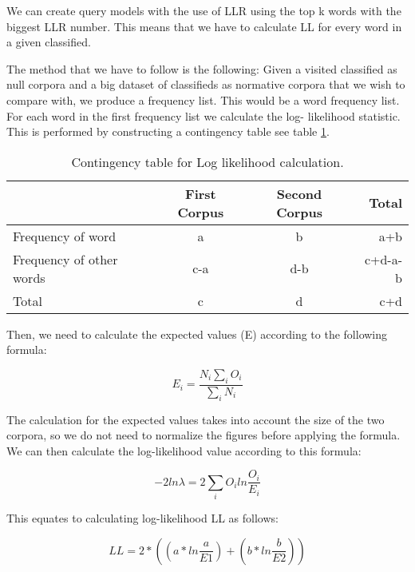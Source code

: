 We can create query models with the use of LLR using the top k words with the biggest LLR number. This means that we have to calculate LL for every word in a given classified.

The method that we have to follow is the following:
Given a visited classified as null corpora and a big dataset of classifieds as normative corpora that we wish to compare with, we produce a frequency list. This would be a word frequency list. For each word in the first frequency list we calculate the log- likelihood statistic. This is performed by constructing a contingency table see table \ref{table:contigency}.


\begin{table}[H]
\begin{center}
\footnotesize
\caption{Contingency table for Log likelihood calculation.}
\label{table:contigency}
\begin{tabular}{lccr}
\toprule
&  First Corpus & Second Corpus & Total \\
\midrule
Frequency of word & a &	b & a+b \\
Frequency of other words & c-a & d-b & c+d-a-b \\
Total & c & d & c+d \\
\bottomrule
\end{tabular}
\end{center}
\end{table}

Then, we need to calculate the expected values (E) according to the following formula:

\begin{equation}
E_i= \frac{N_{i}\sum_{i}{O_{i}}}{\sum_{i}{N_{i}}}
\end{equation}

The calculation for the expected values takes into account the size of the two corpora, so we do not need to normalize the figures before applying the formula. We can then calculate the log-likelihood value according to this formula:

\begin{equation}
-2ln\lambda=2\sum_{i}{O_{i}}{ln \frac{O_{i}}{E_{i}}}
\end{equation}

This equates to calculating log-likelihood LL as follows:

\begin{equation}
LL =2*((a*ln \frac{a}{E1}) + (b*ln \frac{b}{E2}))
\end{equation}

